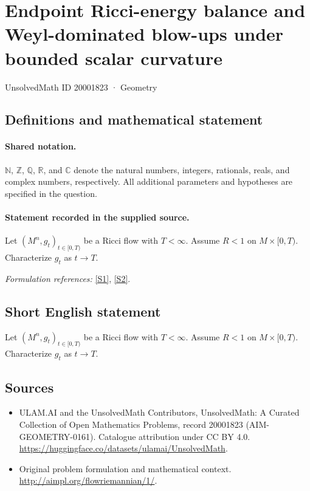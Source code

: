 \documentclass[11pt]{article}
\newcommand{\sref}[2]{\hyperlink{source:#1:#2}{[S#2]}}
\begin{document}
\setcounter{section}{20001822}
\section{Endpoint Ricci-energy balance and Weyl-dominated blow-ups under bounded scalar curvature}\label{20001823}
{\small UnsolvedMath ID 20001823 · Geometry}
\subsection{Definitions and mathematical statement}

\paragraph{Shared notation.}$\mathbb N$, $\mathbb Z$, $\mathbb Q$, $\mathbb R$, and $\mathbb C$ denote the natural numbers, integers, rationals, reals, and complex numbers, respectively. All additional parameters and hypotheses are specified in the question.


\paragraph{Statement recorded in the supplied source.}
Let $(M^n,g_t)_{t\in[0,T)}$ be a Ricci flow with $T<\infty$. Assume $R <1$ on $M\times [0,T)$. Characterize $g_t$ as $t\to T$.
\par\smallskip\textit{Formulation references:} \sref{20001823}{1}, \sref{20001823}{2}.
\subsection{Short English statement}
Let $(M^n,g_t)_{t\in[0,T)}$ be a Ricci flow with $T<\infty$. Assume $R <1$ on $M\times [0,T)$. Characterize $g_t$ as $t\to T$.
\subsection{Sources}
\begin{itemize}
\item[\hypertarget{source:20001823:1}{S1}] ULAM.AI and the UnsolvedMath Contributors, UnsolvedMath: A Curated Collection of Open Mathematics Problems, record 20001823 (AIM-GEOMETRY-0161). Catalogue attribution under CC BY 4.0.
\url{https://huggingface.co/datasets/ulamai/UnsolvedMath}.
\item[\hypertarget{source:20001823:2}{S2}] Original problem formulation and mathematical context.
\url{http://aimpl.org/flowriemannian/1/}.
\end{itemize}
\label{end:20001823}
\end{document}
